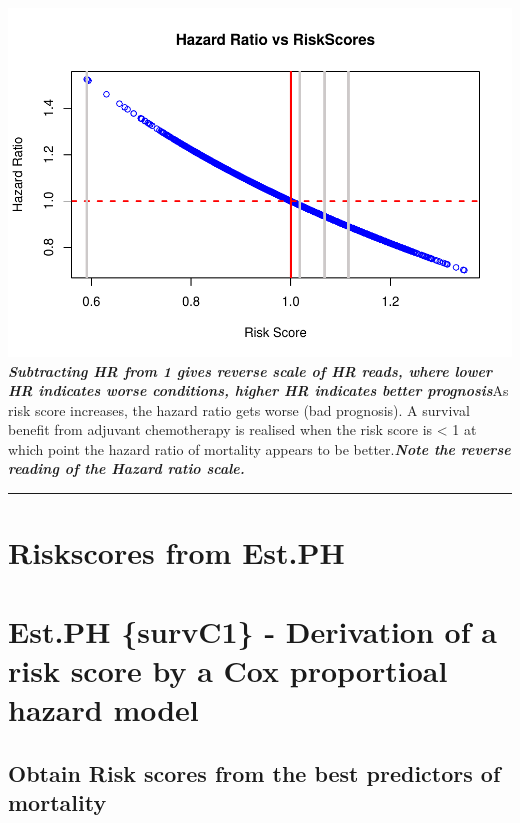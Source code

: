 \documentclass[
  11pt,
]{article}
\begin{document}
\includegraphics{Hazard_and_Risk_plot_updated_files/figure-latex/unnamed-chunk-9-1.pdf}
\textbf{\emph{Subtracting HR from 1 gives reverse scale of HR reads,
where lower HR indicates worse conditions, higher HR indicates better
prognosis}}\newline As risk score increases, the hazard ratio gets worse
(bad prognosis). A survival benefit from adjuvant chemotherapy is
realised when the risk score is \textless{} 1 at which point the hazard
ratio of mortality appears to be better.\newline  \textbf{\emph{Note the
reverse reading of the Hazard ratio scale.}}

\begin{center}\rule{0.5\linewidth}{0.5pt}\end{center}

\newpage
\section{Riskscores from Est.PH}

\hypertarget{est.ph-survc1---derivation-of-a-risk-score-by-a-cox-proportioal-hazard-model}{%
\section{Est.PH \{survC1\} - Derivation of a risk score by a Cox
proportioal hazard
model}\label{est.ph-survc1---derivation-of-a-risk-score-by-a-cox-proportioal-hazard-model}}

\hypertarget{obtain-risk-scores-from-the-best-predictors-of-mortality}{%
\subsection{Obtain Risk scores from the best predictors of
mortality}\label{obtain-risk-scores-from-the-best-predictors-of-mortality}}
\end{document}
